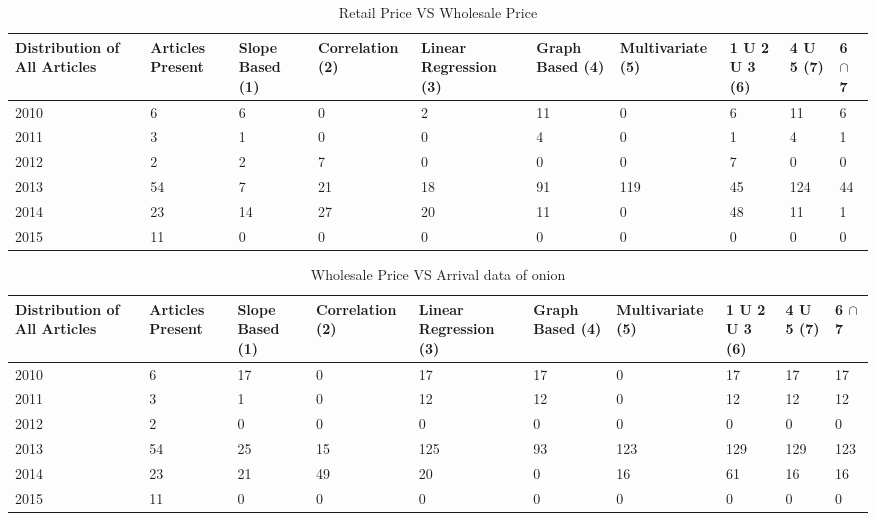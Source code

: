 \documentclass[a4paper,10pt]{report}
\begin{document}
	
	
	
	\begin{table}[]
	\centering
	\resizebox{\textwidth}{!}
	{\begin{tabular}{|l|l|l|l|l|l|l|l|l|l|}
	\hline
	Distribution of All Articles & Articles Present & Slope Based (1) & Correlation (2) & Linear Regression (3) & Graph Based (4) & Multivariate (5) & 1 U 2 U 3 (6) & 4 U 5 (7) & 6 $\cap$ 7 \\
	\hline
	2010 & 6  & 6  & 0  & 2  & 11 & 0   & 6  & 11  & 6  \\
	\hline
	2011 & 3  & 1  & 0  & 0  & 4  & 0   & 1  & 4   & 1  \\
	\hline
	2012 & 2  & 2  & 7  & 0  & 0  & 0   & 7  & 0   & 0  \\
	\hline
	2013 & 54 & 7  & 21 & 18 & 91 & 119 & 45 & 124 & 44 \\
	\hline
	2014 & 23 & 14 & 27 & 20 & 11 & 0   & 48 & 11  & 1  \\
	\hline
	2015 & 11 & 0  & 0  & 0  & 0  & 0   & 0  & 0   & 0 \\
	\hline
	\end{tabular}}	
	\caption{Retail Price VS Wholesale Price}
	\label{RetailVsWholesale}
	\end{table}

	
	
	\begin{table}[]
	\centering
	\resizebox{\textwidth}{!}
	{\begin{tabular}{|l|l|l|l|l|l|l|l|l|l|}
	\hline
	Distribution of All Articles & Articles Present & Slope Based (1) & Correlation (2) & Linear Regression (3) & Graph Based (4) & Multivariate (5) & 1 U 2 U 3 (6) & 4 U 5 (7) & 6 $\cap$ 7  \\
	\hline
	2010 & 6  & 17 & 0  & 17  & 17 & 0   & 17  & 17  & 17  \\
	\hline
	2011 & 3  & 1  & 0  & 12  & 12 & 0   & 12  & 12  & 12  \\
	\hline
	2012 & 2  & 0  & 0  & 0   & 0  & 0   & 0   & 0   & 0   \\
	\hline
	2013 & 54 & 25 & 15 & 125 & 93 & 123 & 129 & 129 & 123 \\
	\hline
	2014 & 23 & 21 & 49 & 20  & 0  & 16  & 61  & 16  & 16  \\
	\hline
	2015 & 11 & 0  & 0  & 0   & 0  & 0   & 0   & 0   & 0   \\
	\hline
	\end{tabular}}	
	\caption{ Wholesale Price VS Arrival data of onion}
	\label{WholesaleVsArrival}
	\end{table}
	
\end{document}
